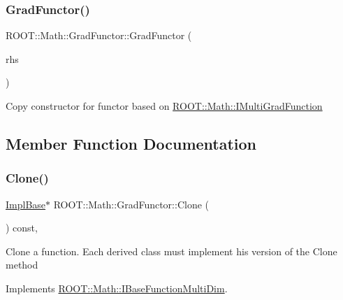 \subsubsection{\texorpdfstring{GradFunctor()}{GradFunctor()}\hspace{0.1cm}{\footnotesize\ttfamily [10/10]}}
{\footnotesize\ttfamily R\+O\+O\+T\+::\+Math\+::\+Grad\+Functor\+::\+Grad\+Functor (\begin{DoxyParamCaption}\item[{const \mbox{\hyperlink{classROOT_1_1Math_1_1GradFunctor}{Grad\+Functor}} \&}]{rhs }\end{DoxyParamCaption})\hspace{0.3cm}{\ttfamily [inline]}}

Copy constructor for functor based on \mbox{\hyperlink{namespaceROOT_1_1Math_a014e019aaf9304a00e9231bd9ed232fb}{R\+O\+O\+T\+::\+Math\+::\+I\+Multi\+Grad\+Function}} 

\subsection{Member Function Documentation}
\mbox{\label{classROOT_1_1Math_1_1GradFunctor_a21093c0d3001069e49ce6278b5a32a40}} 
\subsubsection{\texorpdfstring{Clone()}{Clone()}\hspace{0.1cm}{\footnotesize\ttfamily [1/2]}}
{\footnotesize\ttfamily \mbox{\hyperlink{classROOT_1_1Math_1_1GradFunctor_a1fb9161fc93c7e7fa185dddbcc2c4f4d}{Impl\+Base}}$\ast$ R\+O\+O\+T\+::\+Math\+::\+Grad\+Functor\+::\+Clone (\begin{DoxyParamCaption}{ }\end{DoxyParamCaption}) const\hspace{0.3cm}{\ttfamily [inline]}, {\ttfamily [virtual]}}

Clone a function. Each derived class must implement his version of the Clone method 

Implements \mbox{\hyperlink{classROOT_1_1Math_1_1IBaseFunctionMultiDim_a57939204b1f525b43835b42e0635dd3b}{R\+O\+O\+T\+::\+Math\+::\+I\+Base\+Function\+Multi\+Dim}}.

